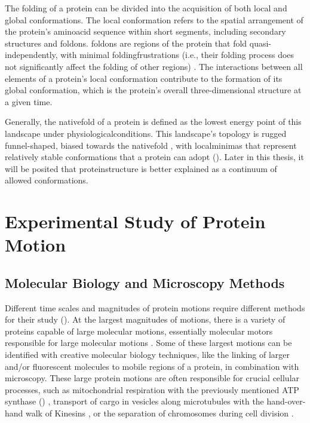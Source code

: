 The folding of a protein can be divided into the acquisition of both local and global \glspl{conformation}. The local \gls{conformation} refers to the spatial arrangement of the protein’s \gls{aminoacid} sequence within short segments, including secondary structures and \glspl{foldon}. \Glspl{foldon} are regions of the protein that fold quasi-independently, with minimal \glspl{foldingfrustration} (i.e., their folding process does not significantly affect the folding of other regions) \cite{panchenko_foldons_1996, maity_protein_2005, englander_nature_2014}. The interactions between all elements of a protein’s local \gls{conformation} contribute to the formation of its global \gls{conformation}, which is the protein's overall three-dimensional structure at a given time.

Generally, the \gls{nativefold} of a protein is defined as the lowest energy point of this landscape under \gls{physiologicalconditions}. This landscape's topology is rugged funnel-shaped, biased towards the \gls{nativefold} \cite{onuchic_theory_2004}, with \glspl{localminima} that represent relatively stable \glspl{conformation} that a protein can adopt \cite{tsai_structured_2001} (). Later in this thesis, it will be posited that \gls{proteinstructure} is better explained as a continuum of allowed \glspl{conformation}.


\section{Experimental Study of Protein Motion}

\subsection{Molecular Biology and Microscopy Methods}

Different time scales and magnitudes of protein motions require different methods for their study (). At the largest magnitudes of motions, there is a variety of proteins capable of large molecular motions, essentially molecular motors responsible for large molecular motions \cite{schliwa_molecular_2003}. Some of these largest motions can be identified with creative molecular biology techniques, like the linking of larger and/or fluorescent molecules to mobile regions of a protein, in combination with \gls{microscopy}. These large protein motions are often responsible for crucial cellular processes, such as mitochondrial respiration with the previously mentioned ATP synthase () \cite{noji_direct_1997, sambongi_mechanical_1999, hirono-hara_pause_2001}, transport of cargo in vesicles along microtubules with the hand-over-hand walk of Kinesins \cite{yildiz_kinesin_2004}, or the separation of chromosomes during cell division \cite{sawin_motor_1991, schliwa_molecular_2003}.

